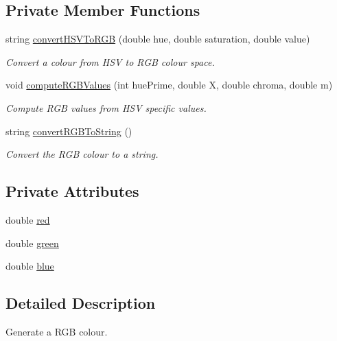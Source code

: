 \subsection*{\-Private \-Member \-Functions}
\begin{DoxyCompactItemize}
\item 
string \hyperlink{classmultiscale_1_1RGBColourGenerator_af29401043271ed11f69cdd0ecf52649e}{convert\-H\-S\-V\-To\-R\-G\-B} (double hue, double saturation, double value)
\begin{DoxyCompactList}\small\item\em \-Convert a colour from \-H\-S\-V to \-R\-G\-B colour space. \end{DoxyCompactList}\item 
void \hyperlink{classmultiscale_1_1RGBColourGenerator_a3c72c2ef3fa50215e73732e324f6f1e1}{compute\-R\-G\-B\-Values} (int hue\-Prime, double \-X, double chroma, double m)
\begin{DoxyCompactList}\small\item\em \-Compute \-R\-G\-B values from \-H\-S\-V specific values. \end{DoxyCompactList}\item 
string \hyperlink{classmultiscale_1_1RGBColourGenerator_ab5600e0c10534f0d80511178c43ec507}{convert\-R\-G\-B\-To\-String} ()
\begin{DoxyCompactList}\small\item\em \-Convert the \-R\-G\-B colour to a string. \end{DoxyCompactList}\end{DoxyCompactItemize}
\subsection*{\-Private \-Attributes}
\begin{DoxyCompactItemize}
\item 
double \hyperlink{classmultiscale_1_1RGBColourGenerator_a11da8c4a9ca59ea8c20177cbb5b57ceb}{red}
\item 
double \hyperlink{classmultiscale_1_1RGBColourGenerator_ae8d94d24b109954be1da2a04c8ec9af7}{green}
\item 
double \hyperlink{classmultiscale_1_1RGBColourGenerator_a5b48dae9174a794eb70c779c05d87c3f}{blue}
\end{DoxyCompactItemize}


\subsection{\-Detailed \-Description}
\-Generate a \-R\-G\-B colour. 

